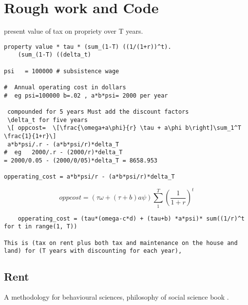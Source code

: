 \chapter{Rough work and Code}
present value of tax on propriety over T years. 


\begin{verbatim}
property value * tau * (sum_(1-T) ((1/(1+r))^t).    
    (sum_(1-T) ((delta_t)

psi   = 100000 # subsistence wage
    
#  Annual operating cost in dollars  
#  eg psi=100000 b=.02 , a*b*psi= 2000 per year 

 compounded for 5 years Must add the discount factors  
 \delta_t for five years 
 \[ oppcost=  \[\frac{\omega+a\phi}{r} \tau + a\phi b\right]\sum_1^T \frac{1}{1+r}\]
 a*b*psi/.r - (a*b*psi/r)*delta_T
#  eg   2000/.r - (2000/r)*delta_T 
= 2000/0.05 - (2000/0/05)*delta_T = 8658.953

opperating_cost = a*b*psi/r - (a*b*psi/r)*delta_T 
\end{verbatim}

\[ oppcost=  \left(\tau\omega  +(\tau+b)a\psi\right)\sum_1^T \left(\frac{1}{1+r}\right)^t\]

\begin{verbatim}
    opperating_cost = (tau*(omega-c*d) + (tau+b) *a*psi)* sum((1/r)^t for t in range(1, T))
    
This is (tax on rent plus both tax and maintenance on the house and land) for (T years with discounting for each year),
\end{verbatim}


\section{Rent}
A methodology for behavioural sciences, philosophy of social science book \cite{kaplanConductInquiryMethodology2017}.




